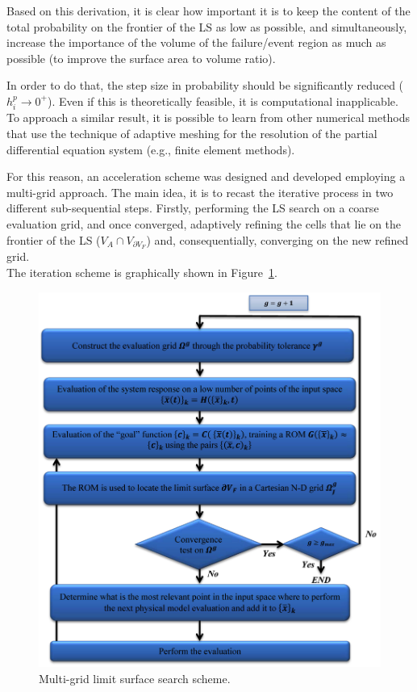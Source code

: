 Based on this derivation, it is clear how important it is to keep the 
content of the total probability on the frontier of the LS as low as 
possible, and simultaneously, increase the importance of the volume of 
the failure/event region as much as possible (to improve the surface 
area to volume ratio).

In order to do that, the step size in probability should be significantly 
reduced ( $h_{i}^{p} \rightarrow 0^{+}$). Even if this is theoretically 
feasible, it is computational inapplicable. To approach a similar result, it 
is possible to learn from other numerical methods that use the 
technique of adaptive meshing for the resolution of the partial 
differential equation system (e.g., finite element methods).

For this reason, an acceleration scheme was designed and developed 
employing a multi-grid approach. The main idea, it is to recast the 
iterative process in two different sub-sequential steps. Firstly, 
performing the LS search on a coarse evaluation grid, and once 
converged, adaptively refining the cells that lie on the frontier of the LS 
($V_{A} \cap V_{\partial V_{F}}$) and, consequentially, converging on 
the new refined grid.
\\The iteration scheme is graphically shown in 
Figure~\ref{fig:LimitSurfaceMultiGridAlgoFlow}.
\begin{figure}[h!]
  \centering
  \includegraphics[width=1.0\textwidth]  {pics/LimitSurfaceMultiGridAlgoFlow.png}
  \caption{Multi-grid limit surface search scheme.}
  \label{fig:LimitSurfaceMultiGridAlgoFlow}
\end{figure}
